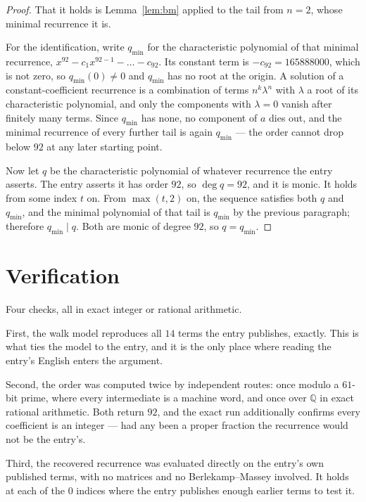 \documentclass[11pt,a4paper]{article}
\theoremstyle{plain}
\theoremstyle{definition}
\begin{document}
\begin{proof}
That it holds is Lemma~\ref{lem:bm} applied to the tail from $n=2$, whose minimal
recurrence it is.

For the identification, write $q_{\min}$ for the characteristic polynomial of that minimal
recurrence, $x^{92}-c_1x^{92-1}-\dots-c_{92}$. Its constant term is
$-c_{92}=165888000$, which is not zero, so $q_{\min}(0)\neq0$ and $q_{\min}$ has no
root at the origin. A solution of a constant-coefficient recurrence is a combination of terms
$n^{k}\lambda^{n}$ with $\lambda$ a root of its characteristic polynomial, and only the
components with $\lambda=0$ vanish after finitely many terms. Since $q_{\min}$ has none, no
component of $a$ dies out, and the minimal recurrence of every further tail is again
$q_{\min}$ --- the order cannot drop below $92$ at any later starting point.

Now let $q$ be the characteristic polynomial of whatever recurrence the entry asserts. The
entry asserts it has order $92$, so $\deg q=92$, and it is monic. It holds from some
index $t$ on. From $\max(t,2)$ on, the sequence satisfies both $q$ and $q_{\min}$, and
the minimal polynomial of that tail is $q_{\min}$ by the previous paragraph; therefore
$q_{\min}\mid q$. Both are monic of degree $92$, so $q=q_{\min}$.
\end{proof}

\section{Verification}

Four checks, all in exact integer or rational arithmetic.

First, the walk model reproduces all $14$ terms the entry publishes, exactly. This is
what ties the model to the entry, and it is the only place where reading the entry's English
enters the argument.

Second, the order was computed twice by independent routes: once modulo a $61$-bit prime, where
every intermediate is a machine word, and once over $\mathbb{Q}$ in exact rational arithmetic.
Both return $92$, and the exact run additionally confirms every coefficient is an integer
--- had any been a proper fraction the recurrence would not be the entry's.

Third, the recovered recurrence was evaluated directly on the entry's own published terms, with
no matrices and no Berlekamp--Massey involved. It holds at each of the $0$ indices where
the entry publishes enough earlier terms to test it.
\end{document}

